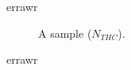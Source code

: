 \documentclass[11pt]{article}
\begin{document}
errawr
\begin{figure}
\caption{A sample ($N_{THC}$).}
\end{figure}
errawr
\end{document}
